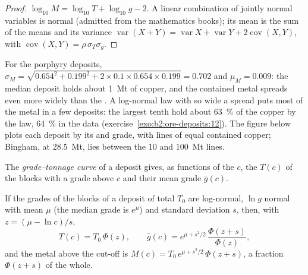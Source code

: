 \begin{proof}
$\log_{10} M = \log_{10} T + \log_{10} g - 2$. A linear combination of jointly normal variables is
normal (admitted from the mathematics books); its mean is the sum of the means and its variance
$\operatorname{var}(X + Y) = \operatorname{var} X + \operatorname{var} Y + 2\operatorname{cov}(X, Y)$,
with $\operatorname{cov}(X, Y) = \rho\,\sigma_T\sigma_g$.
\end{proof}

For the porphyry deposits, $\sigma_M = \sqrt{0.654^2 + 0.199^2 + 2 \times 0.1 \times 0.654 \times
0.199} = 0.702$ and $\mu_M = 0.009$: the median deposit holds about \qty{1}{Mt} of copper, and the
contained metal spreads even more widely than the . A log-normal law with so wide a spread
puts most of the metal in a few deposits: the largest tenth hold about \qty{63}{\percent} of the
copper by the law, \qty{64}{\percent} in the data (exercise~\ref{exo:b2:ore-deposits:12}). The
figure below plots each deposit by its  and grade, with lines of equal contained copper;
Bingham, at \qty{28.5}{Mt}, lies between the 10 and \qty{100}{Mt} lines.

\begin{definition}\label{def:b2:ore-deposits:gt}
The \emph{grade--tonnage curve} of a deposit gives, as functions of
the  $c$, the  $T(c)$ of the blocks with a grade above $c$ and their mean grade
$\bar g(c)$.
\end{definition}

\begin{proposition}\label{prop:b2:ore-deposits:gt}
If the grades of the blocks of a deposit of total  $T_0$ are log-normal, $\ln g$ normal
with mean $\mu$ (the median grade is $e^{\mu}$) and standard deviation $s$, then, with $z = (\mu -
\ln c)/s$,
\begin{equation}
T(c) = T_0\,\Phi(z), \qquad
\bar g(c) = e^{\mu + s^2/2}\,\frac{\Phi(z + s)}{\Phi(z)} ,
\label{eq:b2:ore-deposits:gt}
\end{equation}
and the metal above the cut-off is $M(c) = T_0\,e^{\mu + s^2/2}\,\Phi(z + s)$, a fraction $\Phi(z +
s)$ of the whole.
\end{proposition}

